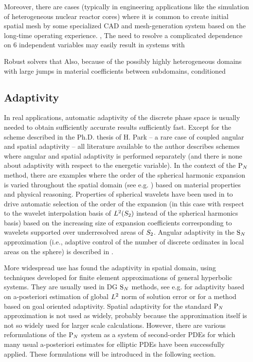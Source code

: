 Moreover, there are cases (typically
in engineering applications like the simulation of heterogeneous nuclear reactor cores) where it is common to create
initial spatial mesh by some specialized CAD and mesh-generation system based on the long-time operating experience. ,
The need to resolve a complicated dependence on 6 independent variables may easily result in systems with

Robust solvers that Also, because of the possibly highly heterogeneous domains with large jumps in material coefficients
between subdomains, conditioned

\subsection{Adaptivity}
In real applications, automatic adaptivity of the discrete phase space is usually needed to obtain sufficiently accurate
results sufficiently fast. Except for the scheme described in the Ph.D. thesis of H. Park \cite{Park} -- a rare case of coupled angular and spatial adaptivity -- all literature
available to the author describes schemes where angular and spatial adaptivity is performed separately (and there is
none about adaptivity with respect to the energetic variable). In the context of the $\PN$ method, there are examples
where the order of the spherical harmonic expansion is varied throughout the spatial domain (see e.g. \cite{Ackroyd2})
based on material properties and physical reasoning. Properties of spherical wavelets have been used in \cite{Buchan} to
drive automatic selection of the order of the expansion (in this case with respect to the wavelet interpolation basis of
$\Lp[2](\Sphere)$ instead of the spherical harmonics basis) based on the increasing size of expansion coefficients
corresponding to wavelets supported over underresolved areas of $\Sphere$. Angular adaptivity in the $\SN$ approximation
(i.e., adaptive control of the number of discrete ordinates in local areas on the sphere) is described in
\cite{Jarrell}.

More widespread use has found the adaptivity in spatial domain, using techniques developed for finite element
approximations of general hyperbolic systems. They are usually used in DG $\SN$ methods, see e.g.
\cite{Fournier,Duo,ragusa2010two} for adaptivity based on a-posteriori estimation of global $\Lp[2]$ norm of solution
error or \cite{LathouwersGoal, Wang2} for a method based on goal oriented adaptivity. Spatial adaptivity for the
standard $\PN$ approximation is not used as widely, probably because the approximation itself is not so widely used for
larger scale calculations. However, there are various reformulations of the $\PN$ system as a system of second-order
PDEs for which many usual a-posteriori estimates for
elliptic PDEs have been successfully applied. These formulations will be introduced in the
following section.


